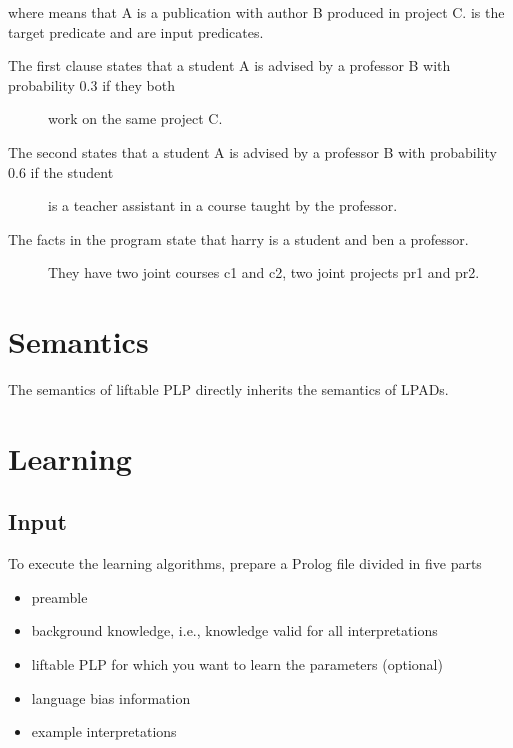 \documentclass[letterpaper,10pt,english]{sphinxmanual}
\begin{document}
\sphinxAtStartPar
where  means that A is a publication with author B produced in project C.
 is the target predicate and 
are input predicates.
\begin{description}
\item[{The first clause states that a student A is advised by a professor B with probability 0.3 if they both}] \leavevmode
\sphinxAtStartPar
work on the same project C.

\item[{The second states that a student A is advised by a professor B with probability 0.6 if the student}] \leavevmode
\sphinxAtStartPar
is a teacher assistant in a course taught by the professor.

\item[{The facts in the program state that harry is a student and ben a professor.}] \leavevmode
\sphinxAtStartPar
They have two joint courses c1 and c2, two joint projects pr1 and pr2.

\end{description}


\chapter{Semantics}
\label{\detokenize{index:semantics}}
\sphinxAtStartPar
The semantics of liftable PLP directly inherits the semantics of LPADs.


\chapter{Learning}
\label{\detokenize{index:learning}}

\section{Input}
\label{\detokenize{index:input}}
\sphinxAtStartPar
To execute the learning algorithms, prepare a Prolog file divided in five parts
\begin{itemize}
\item {} 
\sphinxAtStartPar
preamble

\item {} 
\sphinxAtStartPar
background knowledge, i.e., knowledge valid for all interpretations

\item {} 
\sphinxAtStartPar
liftable PLP for which you want to learn the parameters (optional)

\item {} 
\sphinxAtStartPar
language bias information

\item {} 
\sphinxAtStartPar
example interpretations

\end{itemize}
\end{document}
